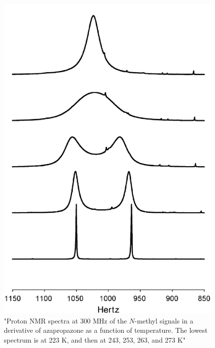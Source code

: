 \begin{figure}[h!]
\begin{center}
\includegraphics[scale=0.5]{figures/chap2/methyldat.eps}
\caption{"Proton NMR spectra at 300 MHz of the $N$-methyl signals in a
derivative of azapropazone as a function of temperature. The lowest spectrum is at 223 K, and then
at 243, 253, 263, and 273 K"~\cite{Bain200363}}
\label{figure:datamet}
\end{center}
\end{figure}           
        
